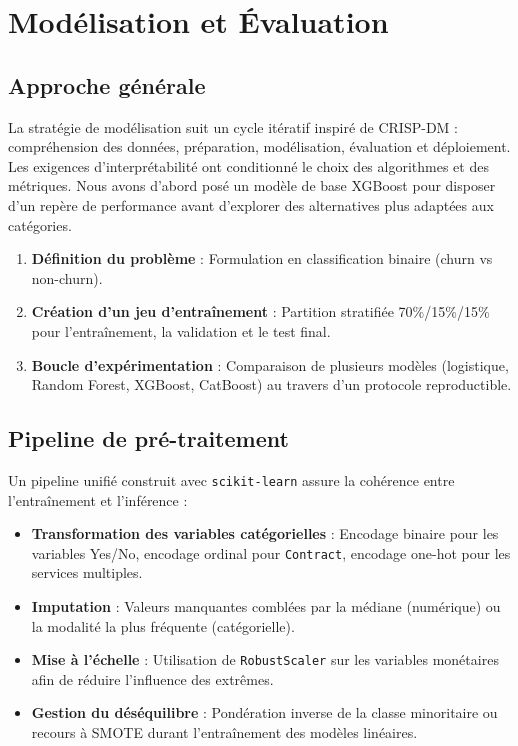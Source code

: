 \chapter{Mod\'elisation et \'Evaluation}
\label{chap:modelisation_evaluation}

\section{Approche g\'en\'erale}
La strat\'egie de mod\'elisation suit un cycle it\'eratif inspir\'e de CRISP-DM : compr\'ehension des donn\'ees, pr\'eparation, mod\'elisation, \'evaluation et d\'eploiement. Les exigences d'interpr\'etabilit\'e ont conditionn\'e le choix des algorithmes et des m\'etriques. Nous avons d'abord pos\'e un mod\`ele de base XGBoost pour disposer d'un rep\`ere de performance avant d'explorer des alternatives plus adapt\'ees aux cat\'egories.
\begin{enumerate}
    \item \textbf{D\'efinition du probl\`eme} : Formulation en classification binaire (churn vs non-churn).
    \item \textbf{Création d'un jeu d'entra\^inement} : Partition stratifi\'ee 70\%/15\%/15\% pour l'entra\^inement, la validation et le test final.
    \item \textbf{Boucle d'exp\'erimentation} : Comparaison de plusieurs mod\`eles (logistique, Random Forest, XGBoost, CatBoost) au travers d'un protocole reproductible.
\end{enumerate}

\section{Pipeline de pr\'e-traitement}
Un pipeline unifi\'e construit avec \texttt{scikit-learn} assure la coh\'erence entre l'entra\^inement et l'inf\'erence :
\begin{itemize}
    \item \textbf{Transformation des variables cat\'egorielles} : Encodage binaire pour les variables Yes/No, encodage ordinal pour \texttt{Contract}, encodage one-hot pour les services multiples.
    \item \textbf{Imputation} : Valeurs manquantes combl\'ees par la m\'ediane (num\'erique) ou la modalit\'e la plus fr\'equente (cat\'egorielle).
    \item \textbf{Mise \`a l'\'echelle} : Utilisation de \texttt{RobustScaler} sur les variables mon\'etaires afin de r\'eduire l'influence des extr\^emes.
    \item \textbf{Gestion du d\'es\'equilibre} : Pond\'eration inverse de la classe minoritaire ou recours \`a SMOTE durant l'entra\^inement des mod\`eles lin\'eaires.
\end{itemize}

